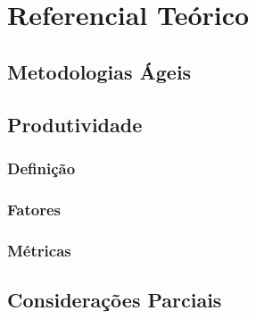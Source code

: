 \chapter[Referencial Teórico]{Referencial Teórico}

\section{Metodologias Ágeis}
\section{Produtividade}
\subsection{Definição}
\subsection{Fatores}
\subsection{Métricas}
\section{Considerações Parciais}
